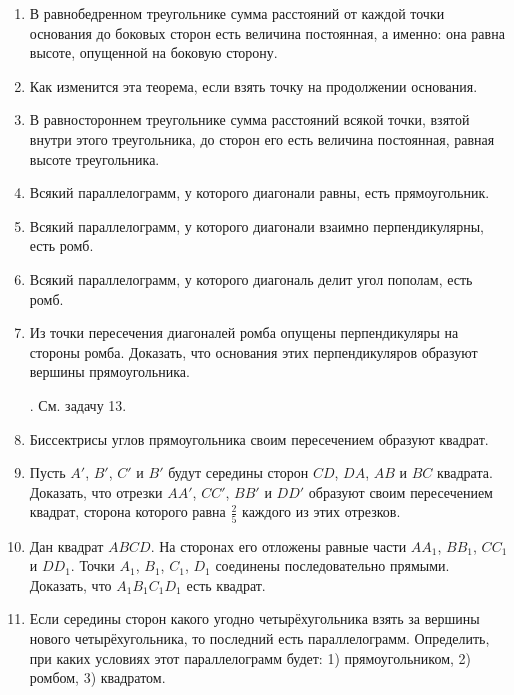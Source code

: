 \documentclass[twoside]{book}
\begin{document}
\begin{enumerate}
 \item
В равнобедренном треугольнике сумма расстояний от каждой точки основания до боковых сторон есть величина постоянная, а именно:
она равна высоте, опущенной на боковую сторону.

 \item
Как изменится эта теорема, если взять точку на продолжении основания.

 \item
В равностороннем треугольнике сумма расстояний всякой точки, взятой внутри этого треугольника, до сторон его есть величина постоянная, равная высоте треугольника.

 \item
Всякий параллелограмм, у которого диагонали равны, есть прямоугольник.

 \item
Всякий параллелограмм, у которого диагонали взаимно перпендикулярны, есть ромб.

 \item
Всякий параллелограмм, у которого диагональ делит угол пополам, есть ромб.

 \item
Из точки пересечения диагоналей ромба опущены перпендикуляры на стороны ромба.
Доказать, что основания этих перпендикуляров образуют вершины прямоугольника.

\smallskip
{}.
См.
задачу 13.

 \item
Биссектрисы углов прямоугольника своим пересечением образуют квадрат.

 \item
Пусть $A'$, $B'$, $C'$ и $B'$ будут середины сторон $CD$, $DA$, $AB$ и $BC$ квадрата.
Доказать, что отрезки $AA'$, $CC'$, $BB'$ и $DD'$ образуют своим пересечением квадрат, сторона которого равна $\tfrac25$ каждого из этих отрезков.

 \item
Дан квадрат $ABCD$.
На сторонах его отложены равные части $AA_1$, $BB_1$, $CC_1$ и $DD_1$.
Точки $A_1$, $B_1$, $C_1$, $D_1$ соединены последовательно прямыми.
Доказать, что $A_1B_1C_1D_1$ есть квадрат.

 \item
Если середины сторон какого угодно четырёхугольника взять за вершины нового четырёхугольника, то последний есть параллелограмм.
Определить, при каких условиях этот параллелограмм будет:
1) прямоугольником, 2) ромбом, 3) квадратом.

\end{enumerate}
\end{document}
